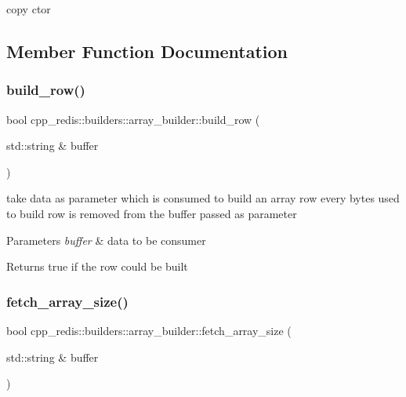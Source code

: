 copy ctor 



\subsection{Member Function Documentation}
\mbox{\label{classcpp__redis_1_1builders_1_1array__builder_a89c6df1f961723051f3338bdd54a6a9f}} 
\subsubsection{\texorpdfstring{build\+\_\+row()}{build\_row()}}
{\footnotesize\ttfamily bool cpp\+\_\+redis\+::builders\+::array\+\_\+builder\+::build\+\_\+row (\begin{DoxyParamCaption}\item[{std\+::string \&}]{buffer }\end{DoxyParamCaption})\hspace{0.3cm}{\ttfamily [private]}}

take data as parameter which is consumed to build an array row every bytes used to build row is removed from the buffer passed as parameter


\begin{DoxyParams}{Parameters}
{\em buffer} & data to be consumer \\
\hline
\end{DoxyParams}
\begin{DoxyReturn}{Returns}
true if the row could be built 
\end{DoxyReturn}
\mbox{\label{classcpp__redis_1_1builders_1_1array__builder_a1592420664b191c9133ed364fcb40aa0}} 
\subsubsection{\texorpdfstring{fetch\+\_\+array\+\_\+size()}{fetch\_array\_size()}}
{\footnotesize\ttfamily bool cpp\+\_\+redis\+::builders\+::array\+\_\+builder\+::fetch\+\_\+array\+\_\+size (\begin{DoxyParamCaption}\item[{std\+::string \&}]{buffer }\end{DoxyParamCaption})\hspace{0.3cm}{\ttfamily [private]}}

